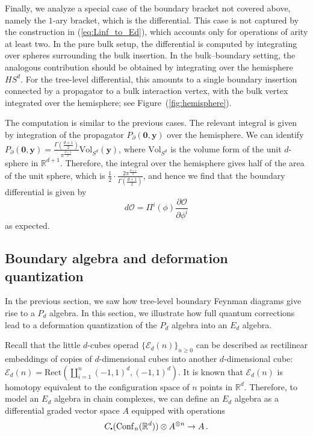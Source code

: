 \documentclass[11pt]{article}
\newcommand{\R}{\mathbb{R}}
\newcommand\sbullet[1][.5]{\mathbin{\vcenter{\hbox{\scalebox{#1}{$\bullet$}}}}}
\numberwithin{equation}{section}
\begin{document}
Finally, we analyze a special case of the boundary bracket not covered above, namely the $1$-ary bracket, which is the differential. This case is not captured by the construction in (\ref{eq:Linf_to_Ed}), which accounts only for operations of arity at least two. In the pure bulk setup, the differential is computed by integrating over spheres surrounding the bulk insertion. In the bulk–boundary setting, the analogous contribution should be obtained by integrating over the hemisphere $HS^{d}$. For the tree-level differential, this amounts to a single boundary insertion connected by a propagator to a bulk interaction vertex, with the bulk vertex integrated over the hemisphere; see Figure~(\ref{fig:hemisphere}).


The computation is similar to the previous cases. The relevant integral is given by integration of the propagator $P_{\partial}(\boldsymbol{0},\boldsymbol{y})$ over the hemisphere. We can identify $P_{\partial}(\boldsymbol{0},\boldsymbol{y}) = \frac{\Gamma(\frac{d+1}{2})}{\pi^{\frac{d+1}{2}}} \mathrm{Vol}_{S^{d}}(\boldsymbol{y})$, where $\mathrm{Vol}_{S^{d}}$ is the volume form of the unit $d$-sphere in $\R^{d+1}$. Therefore, the integral over the hemisphere gives half of the area of the unit sphere, which is $\frac{1}{2} \cdot \frac{2\pi^{\frac{d+1}{2}}}{\Gamma(\frac{d+1}{2})}$, and hence we find that the boundary differential is given by
\begin{equation}
	d\mathcal{O} = \Pi^{i}(\phi)\frac{\partial \mathcal{O}}{\partial \phi^i}
\end{equation}
as expected.


\subsection{Boundary algebra and deformation quantization}
In the previous section, we saw how tree-level boundary Feynman diagrams give rise to a $P_d$ algebra. In this section, we illustrate how full quantum corrections lead to a deformation quantization of the $P_d$ algebra into an $E_d$ algebra.


Recall that the little $d$-cubes operad $\{\mathcal{E}_d(n)\}_{n\geq 0}$ can be described as rectilinear embeddings of copies of $d$-dimensional cubes into another $d$-dimensional cube: $\mathcal{E}_d(n) = \mathrm{Rect}(\amalg_{i = 1}^n(-1,1)^d,(-1,1)^d)$. It is known that $\mathcal{E}_d(n)$ is homotopy equivalent to the configuration space of $n$ points in $\R^d$. Therefore, to model an $E_d$ algebra in chain complexes, we can define an $E_d$ algebra as a differential graded vector space $A$ equipped with operations
\begin{equation}
	C_{\sbullet}(\mathrm{Conf}_{n}(\R^d))\otimes A^{\otimes n} \to A \,.
\end{equation}
\end{document}
